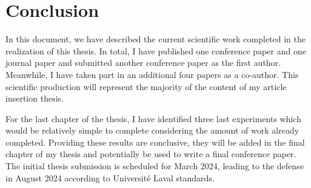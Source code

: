 \section{Conclusion}
\label{sec:conclusion}

In this document, we have described the current scientific work completed in the realization of this thesis.
In total, I have published one conference paper and one journal paper and submitted another conference paper as the first author.
Meanwhile, I have taken part in an additional four papers as a co-author.
This scientific production will represent the majority of the content of my article insertion thesis.

For the last chapter of the thesis, I have identified three last experiments which would be relatively simple to complete considering the amount of work already completed.
Providing these results are conclusive, they will be added in the final chapter of my thesis and potentially be used to write a final conference paper.
The initial thesis submission is scheduled for March 2024, leading to the defense in August 2024 according to Université Laval standards.

